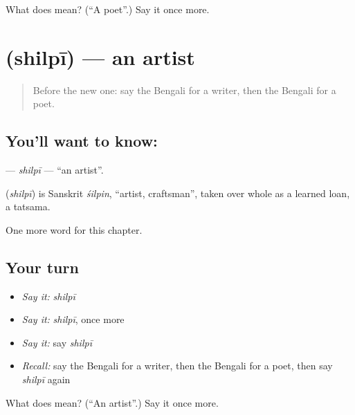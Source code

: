 \begin{tcolorbox}[breakable,colback=teal!4,colframe=teal!35!black,title={Before you move on}]
What does  mean? (\textquotedblleft{}A poet\textquotedblright{}.) Say it once more.
\end{tcolorbox}
\section[\texorpdfstring{\bn{শিল্পী} (shilpī)}{শিল্পী (shilpī)}]{ (shilpī) — an artist}

\label{lesson:BN-C262-shilpi}



\begin{quote}
Before the new one: say the Bengali for a writer, then the Bengali for a poet.
\end{quote}

\subsection*{You'll want to know: }
\textbf{} — \emph{shilpī} — \textquotedblleft{}an artist\textquotedblright{}.

\begin{cousinweb}
\textbf{} (\emph{shilpī}) is Sanskrit \emph{śilpin}, \textquotedblleft{}artist, craftsman\textquotedblright{}, taken over whole as a learned loan, a tatsama.
\end{cousinweb}

\begin{grammarlens}[title={What you've built}]
One more word for this chapter.
\end{grammarlens}

\subsection*{Your turn}
\begin{itemize}
\raggedright
  \item \emph{Say it:} \emph{shilpī}
  \item \emph{Say it:} \emph{shilpī}, once more
  \item \emph{Say it:} say \emph{shilpī}
  \item \emph{Recall:} say the Bengali for a writer, then the Bengali for a poet, then say \emph{shilpī} again
\end{itemize}

\begin{tcolorbox}[breakable,colback=teal!4,colframe=teal!35!black,title={Before you move on}]
What does  mean? (\textquotedblleft{}An artist\textquotedblright{}.) Say it once more.
\end{tcolorbox}
